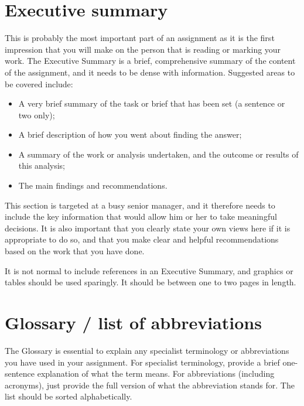 \documentclass{bcrre_assignment}
\begin{document}

\maketitle

\justifying %

\chapter*{Executive summary}
This is probably the most important part of an assignment as it is the first impression that you will make on the person that is reading or marking your work.  The Executive Summary is a brief, comprehensive summary of the content of the assignment, and it needs to be dense with information.  Suggested areas to be covered include:

\begin{itemize}
    \item A very brief summary of the task or brief that has been set (a sentence or two only); 
    \item A brief description of how you went about finding the answer;
    \item A summary of the work or analysis undertaken, and the outcome or results of this analysis; 
    \item The main findings and recommendations.
\end{itemize}

This section is targeted at a busy senior manager, and it therefore needs to include the key information that would allow him or her to take meaningful decisions.  It is also important that you clearly state your own views here if it is appropriate to do so, and that you make clear and helpful recommendations based on the work that you have done. 

It is not normal to include references in an Executive Summary, and graphics or tables should be used sparingly.  It should be between one to two pages in length.

\newpage

\tableofcontents
\begingroup \let\clearpage\relax 
\listoffigures
\listoftables
\chapter*{Glossary / list of abbreviations}
The Glossary is essential to explain any specialist terminology or abbreviations you have used in your assignment.  For specialist terminology, provide a brief one-sentence explanation of what the term means. For abbreviations (including acronyms), just provide the full version of what the abbreviation stands for.  The list should be sorted alphabetically.
\end{document}
